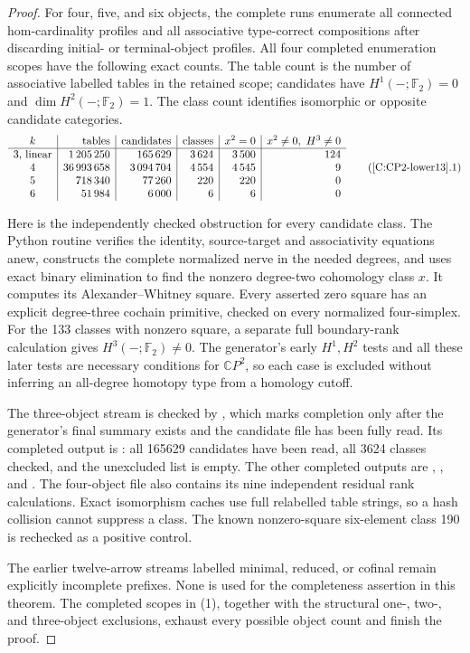 \begin{proof}
For four, five, and six objects, the complete
 runs enumerate all
connected hom-cardinality profiles and all associative
type-correct compositions after discarding initial- or
terminal-object profiles. All four completed enumeration
scopes have the following exact counts. The table count is
the number of associative labelled tables in the retained
scope; candidates have $H^1(-;\mathbb F_2)=0$ and
$\dim H^2(-;\mathbb F_2)=1$. The class count identifies
isomorphic or opposite candidate categories.
\[
\begin{array}{c|r|r|r|r|r}
 k&\text{tables}&\text{candidates}&\text{classes}
      &x^2=0&x^2\ne0,\ H^3\ne0\\\hline
 3\text{, linear}&1\,205\,250&165\,629&3\,624&3\,500&124\\
 4&36\,993\,658&3\,094\,704&4\,554&4\,545&9\\
 5&718\,340&77\,260&220&220&0\\
 6&51\,984&6\,000&6&6&0
\end{array}                                                    \tag{\ref{C:CP2-lower13}.1}
\]

Here is the independently checked obstruction for every
candidate class. The Python routine
 verifies the identity,
source-target and associativity equations anew, constructs
the complete normalized nerve in the needed degrees, and
uses exact binary elimination to find the nonzero degree-two
cohomology class $x$. It computes its Alexander--Whitney
square. Every asserted zero square has an explicit degree-three
cochain primitive, checked on every normalized four-simplex.
For the 133 classes with nonzero square, a separate full
boundary-rank calculation gives $H^3(-;\mathbb F_2)\ne0$.
The generator's early $H^1,H^2$ tests and all these later
tests are necessary conditions for $\mathbb CP^2$, so each
case is excluded without inferring an all-degree homotopy
type from a homology cutoff.

The three-object stream is checked by
, which marks completion
only after the generator's final summary exists and the
candidate file has been fully read. Its completed output is
:
all 165629 candidates have been read, all 3624 classes checked,
and the unexcluded list is empty.
The other completed outputs are
,
, and
.
The four-object file also contains its nine independent
residual rank calculations. Exact isomorphism caches use full
relabelled table strings, so a hash collision cannot suppress
a class. The known nonzero-square six-element class 190 is
rechecked as a positive control.

The earlier twelve-arrow streams labelled minimal, reduced,
or cofinal remain explicitly incomplete prefixes. None is
used for the completeness assertion in this theorem.
The completed scopes in (1), together with the structural
one-, two-, and three-object exclusions, exhaust every
possible object count and finish the proof.
\end{proof}
